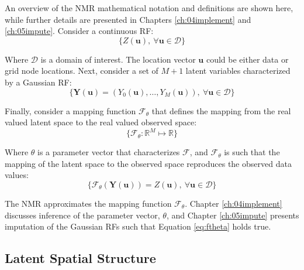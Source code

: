 An overview of the \gls{NMR} mathematical notation and definitions are shown here, while further details are presented in Chapters \ref{ch:04implement} and \ref{ch:05impute}. Consider a continuous \gls{RF}:
\begin{equation}
    \{Z(\mathbf{u}), \ \forall \mathbf{u} \in \mathcal{D}\}
    \label{eq:zu}
\end{equation}

Where $\mathcal{D}$ is a domain of interest. The location vector $\mathbf{u}$ could be either data or grid node locations. Next, consider a set of $M+1$ latent variables characterized by a Gaussian \gls{RF}:
\begin{equation}
    \{\mathbf{Y}(\mathbf{u}) = (Y_{0}(\mathbf{u}), \dots, Y_{M}(\mathbf{u})), \ \forall \mathbf{u} \in \mathcal{D}\}
    \label{eq:gpool}
\end{equation}

Finally, consider a mapping function $\mathcal{F}_{\theta}$ that defines the mapping from the real valued latent space to the real valued observed space:
\begin{equation}
    \{\mathcal{F}_{\theta}: \mathbb{R}^{M} \mapsto \mathbb{R} \}
    \label{eq:fmap}
\end{equation}

Where $\theta$ is a parameter vector that characterizes $\mathcal{F}$, and $\mathcal{F}_{\theta}$ is such that the mapping of the latent space to the observed space reproduces the observed data values:
\begin{equation}
    \{\mathcal{F}_{\theta}(\mathbf{Y}(\mathbf{u})) = Z(\mathbf{u}), \ \forall \mathbf{u} \in \mathcal{D}\}
    \label{eq:ftheta}
\end{equation}

The \gls{NMR} approximates the mapping function $\mathcal{F}_{\theta}$. Chapter \ref{ch:04implement} discusses inference of the parameter vector, $\theta$, and Chapter \ref{ch:05impute} presents imputation of the Gaussian \glspl{RF} such that Equation \ref{eq:ftheta} holds true.

\FloatBarrier
\subsection{Latent Spatial Structure}
\label{subsec:03latent}


